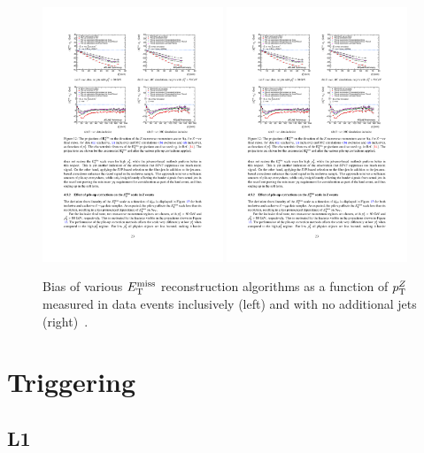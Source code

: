 \begin{figure}[tp]
  \centering
  \includegraphics[width=0.48\textwidth]{figures/performance/met-bias-inclusive}
  \includegraphics[width=0.48\textwidth]{figures/performance/met-bias-0jet}
  \caption{Bias of various $E_{\mathrm{T}}^{\mathrm{miss}}$ reconstruction algorithms as a function of $p_{\mathrm{T}}^Z$ measured in data events inclusively (left) and with no additional jets (right)~\cite{ATLAS-CONF-2014-019}.}
  \label{fig:objects-met-bias}
\end{figure}

\section{Triggering}
\subsection{L1}
